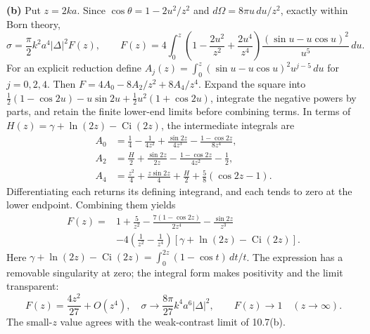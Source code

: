 \textbf{(b)} Put $z=2ka$. Since
$\cos\theta=1-2u^2/z^2$ and $d\Omega=8\pi u\,du/z^2$, exactly within
Born theory,
\[
\sigma=\frac{\pi}{2}k^2a^4|\Delta|^2F(z),\qquad
F(z)=4\int_0^z
\left(1-\frac{2u^2}{z^2}+\frac{2u^4}{z^4}\right)
\frac{(\sin u-u\cos u)^2}{u^5}\,du.
\]
For an explicit reduction define
$A_j(z)=\int_0^z(\sin u-u\cos u)^2u^{j-5}\,du$ for $j=0,2,4$.
Then $F=4A_0-8A_2/z^2+8A_4/z^4$.
Expand the square into
$\tfrac12(1-\cos2u)-u\sin2u+\tfrac12u^2(1+\cos2u)$,
integrate the negative powers by parts, and retain the finite lower-end
limits before combining terms. In terms of
$H(z)=\gamma+\ln(2z)-\operatorname{Ci}(2z)$, the intermediate integrals are
\[
\begin{split}
A_0&=\frac14-\frac1{4z^2}+\frac{\sin2z}{4z^3}
-\frac{1-\cos2z}{8z^4},\\
A_2&=\frac H2+\frac{\sin2z}{2z}
-\frac{1-\cos2z}{4z^2}-\frac12,\\
A_4&=\frac{z^2}{4}+\frac{z\sin2z}{4}
+\frac H2+\frac58(\cos2z-1).
\end{split}
\]
Differentiating each returns its defining integrand, and each tends to
zero at the lower endpoint. Combining them yields
\[
\boxed{\begin{aligned}
F(z)={}&1+\frac5{z^2}
-\frac{7(1-\cos2z)}{2z^4}-\frac{\sin2z}{z^3}\\
&-4\left(\frac1{z^2}-\frac1{z^4}\right)
[\gamma+\ln(2z)-\operatorname{Ci}(2z)] .
\end{aligned}}
\]
Here $\gamma+\ln(2z)-\operatorname{Ci}(2z)
=\int_0^{2z}(1-\cos t)\,dt/t$.
The expression has a removable singularity at zero; the integral form
makes positivity and the limit transparent:
\[
F(z)=\frac{4z^2}{27}+O(z^4),\quad
\sigma\longrightarrow\frac{8\pi}{27}k^4a^6|\Delta|^2,\qquad
F(z)\longrightarrow1\quad(z\to\infty).
\]
The small-$z$ value agrees with the weak-contrast limit of 10.7(b).

